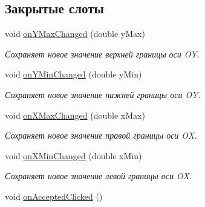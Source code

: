 \subsection*{Закрытые слоты}
\begin{DoxyCompactItemize}
\item 
void \hyperlink{class_ranges_dialog_a4b7d45fb0b5f225da1305ef8ce80ad6e}{on\+Y\+Max\+Changed} (double y\+Max)\hypertarget{class_ranges_dialog_a4b7d45fb0b5f225da1305ef8ce80ad6e}{}\label{class_ranges_dialog_a4b7d45fb0b5f225da1305ef8ce80ad6e}

\begin{DoxyCompactList}\small\item\em Сохраняет новое значение верхней границы оси OY. \end{DoxyCompactList}\item 
void \hyperlink{class_ranges_dialog_a8f9567a3bc26d5e75c17a0eb85298869}{on\+Y\+Min\+Changed} (double y\+Min)\hypertarget{class_ranges_dialog_a8f9567a3bc26d5e75c17a0eb85298869}{}\label{class_ranges_dialog_a8f9567a3bc26d5e75c17a0eb85298869}

\begin{DoxyCompactList}\small\item\em Сохраняет новое значение нижней границы оси OY. \end{DoxyCompactList}\item 
void \hyperlink{class_ranges_dialog_a58929e0764374f0f07406b8a3042bad3}{on\+X\+Max\+Changed} (double x\+Max)\hypertarget{class_ranges_dialog_a58929e0764374f0f07406b8a3042bad3}{}\label{class_ranges_dialog_a58929e0764374f0f07406b8a3042bad3}

\begin{DoxyCompactList}\small\item\em Сохраняет новое значение правой границы оси OX. \end{DoxyCompactList}\item 
void \hyperlink{class_ranges_dialog_a64b596bcf23ba7e4bc1b94b60e0b64d0}{on\+X\+Min\+Changed} (double x\+Min)\hypertarget{class_ranges_dialog_a64b596bcf23ba7e4bc1b94b60e0b64d0}{}\label{class_ranges_dialog_a64b596bcf23ba7e4bc1b94b60e0b64d0}

\begin{DoxyCompactList}\small\item\em Сохраняет новое значение левой границы оси OX. \end{DoxyCompactList}\item 
void \hyperlink{class_ranges_dialog_af9c1d18ebe5c3d31135f5fc448a78197}{on\+Accepted\+Clicked} ()\hypertarget{class_ranges_dialog_af9c1d18ebe5c3d31135f5fc448a78197}{}\label{class_ranges_dialog_af9c1d18ebe5c3d31135f5fc448a78197}


\end{DoxyCompactItemize}
